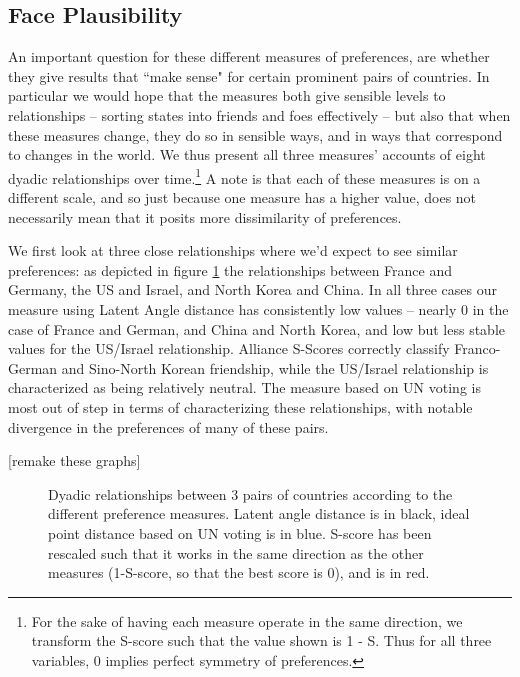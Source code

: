 \subsection{Face Plausibility}

An important question for these different measures of preferences, are whether they give results that ``make sense" for certain prominent pairs of countries. In particular we would hope that the measures both give sensible levels to relationships -- sorting states into friends and foes effectively -- but also that when these measures change, they do so in sensible ways, and in ways that correspond to changes in the world. We thus present all three measures' accounts of eight dyadic relationships over time.\footnote{For the sake of having each measure operate in the same direction, we transform the S-score such that the value shown is 1 - S. Thus for all three variables, $0$ implies perfect symmetry of preferences.} A note is that each of these measures is on a different scale, and so just because one measure has a higher value, does not necessarily mean that it posits more dissimilarity of preferences.

We first look at three close relationships where we'd expect to see similar preferences: as depicted in figure \ref{friendly:dyads} the relationships between France and Germany, the US and Israel, and North Korea and China. In all three cases our measure using Latent Angle distance has consistently low values -- nearly $0$ in the case of France and German, and China and North Korea, and low but less stable values for the US/Israel relationship. Alliance S-Scores correctly classify Franco-German and Sino-North Korean friendship, while the US/Israel relationship is characterized as being relatively neutral. The measure based on UN voting is most out of step in terms of characterizing these relationships, with notable divergence in the preferences of many of these pairs.

[remake these graphs]
\begin{figure}
\caption{Dyadic relationships between 3 pairs of countries according to the different preference measures. Latent angle distance is in black, ideal point distance based on UN voting is in blue. S-score has been rescaled such that it works in the same direction as the other measures (1-S-score, so that the best score is 0), and is in red.}
\label{friendly:dyads}
\end{figure}

